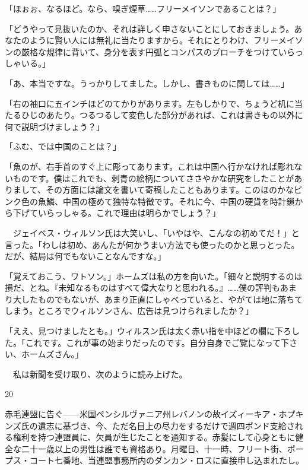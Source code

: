 \documentclass[tate,paper=b6j,jafontsize=9pt]{jlreq}
\begin{document}
「ほぉぉ、なるほど。なら、嗅ぎ煙草……フリーメイソンであることは？」

「どうやって見抜いたのか、それは詳しく申さないことにしておきましょう。あなたのように賢い人には無礼に当たりますから。それにとりわけ、フリーメイソンの厳格な規律に背いて、身分を表す円弧とコンパスのブローチをつけていらっしゃいる。」

「あ、本当ですな。うっかりしてました。しかし、書きものに関しては……」

「右の袖口に五インチほどのてかりがあります。左もしかりで、ちょうど机に当たるひじのあたり。つるつるして変色した部分があれば、これは書きもの以外に何で説明づけましょう？」

「ふむ、では中国のことは？」

「魚のが、右手首のすぐ上に彫ってあります。これは中国へ行かなければ彫れないものです。僕はこれでも、刺青の絵柄についてささやかな研究をしたことがありまして、その方面には論文を書いて寄稿したこともあります。このほのかなピンク色の魚鱗、中国の極めて独特な特徴です。それに今、中国の硬貨を時計鎖から下げていらっしゃる。これで理由は明らかでしょう？」

　ジェイベス・ウィルソン氏は大笑いし、「いやはや、こんなの初めてだ！」と言った。「わしは初め、あんたが何かうまい方法でも使ったのかと思っとった。だが、結局は何でもないことなんですな。」

「覚えておこう、ワトソン。」ホームズは私の方を向いた。「細々と説明するのは損だ、とね。『未知なるものはすべて偉大なりと思われる。』……僕の評判もあまり大したものでもないが、あまり正直にしゃべっていると、やがては地に落ちてしまう。ところでウィルソンさん、広告は見つけられましたか？」

「ええ、見つけましたとも。」ウィルスン氏は太く赤い指を中ほどの欄に下ろした。「これです。これが事の始まりだったのです。自分自身でご覧になって下さい、ホームズさん。」

　私は新聞を受け取り、次のように読み上げた。


\begin{azconvIndented}{2\zw}{0\zw}

赤毛連盟に告ぐ------米国ペンシルヴァニア州レバノンの故イズィーキア・ホプキンズ氏の遺志に基づき、今、ただ名目上の尽力をするだけで週四ポンド支給される権利を持つ連盟員に、欠員が生じたことを通知する。赤髪にして心身ともに健全な二十一歳以上の男性は誰でも資格あり。月曜日、十一時、フリート街、ポープス・コート七番地、当連盟事務所内のダンカン・ロスに直接申し込まれたし。

\end{azconvIndented}
\end{document}
